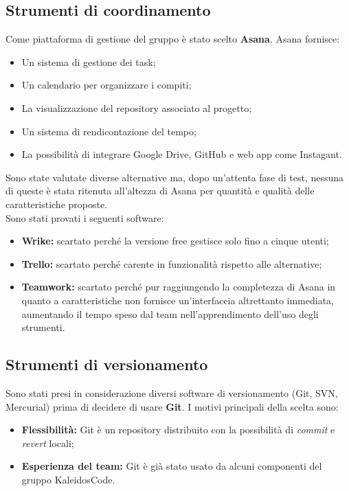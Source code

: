 \documentclass[../NormeDiProgetto.tex]{subfiles}
\begin{document}
		\subsection{Strumenti di coordinamento}
			Come piattaforma di gestione del gruppo è stato scelto \textbf{Asana}. Asana fornisce:
			\begin{itemize}
				\item Un sistema di gestione dei task;
				\item Un calendario per organizzare i compiti;
				\item La visualizzazione del repository associato al progetto;
				\item Un sistema di rendicontazione del tempo;
				\item La possibilità di integrare Google Drive, GitHub e web app come Instagant.
			\end{itemize}
			Sono state valutate diverse alternative ma, dopo un'attenta fase di test, nessuna di queste è stata ritenuta all'altezza di Asana per quantità e qualità delle caratteristiche proposte. \\
			Sono stati provati i seguenti software:
			\begin{itemize}
				\item \textbf{Wrike:} scartato perché la versione free gestisce solo fino a cinque utenti;
				\item \textbf{Trello:} scartato perché carente in funzionalità rispetto alle alternative;  
				\item \textbf{Teamwork:} scartato perché pur raggiungendo la completezza di Asana in quanto a caratteristiche non fornisce un'interfaccia altrettanto immediata, aumentando il tempo speso dal team nell'apprendimento dell'uso degli strumenti.
			\end{itemize}
		\subsection{Strumenti di versionamento}
			Sono stati presi in considerazione diversi software di versionamento (Git, SVN, Mercurial) prima di decidere di usare \textbf{Git}. I motivi principali della scelta sono: 
			\begin{itemize}
				\item \textbf{Flessibilità:} Git è un repository distribuito con la possibilità di \textit{commit} e \textit{revert} locali;
				\item \textbf{Esperienza del team:} Git è già stato usato da alcuni componenti del gruppo KaleidosCode.
			\end{itemize}
\end{document}
